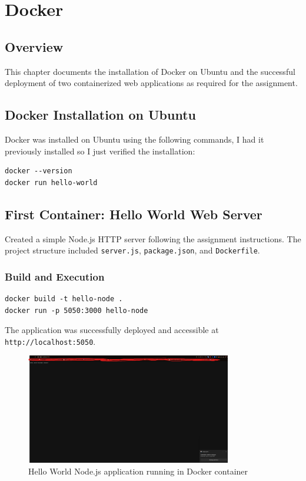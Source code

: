 \chapter{Docker}

\section{Overview}
This chapter documents the installation of Docker on Ubuntu and the successful deployment of two containerized web applications as required for the assignment.

\section{Docker Installation on Ubuntu}
Docker was installed on Ubuntu using the following commands, I had it previously installed so I just verified the installation:

\begin{verbatim}
docker --version
docker run hello-world
\end{verbatim}

\section{First Container: Hello World Web Server}
Created a simple Node.js HTTP server following the assignment instructions. The project structure included \texttt{server.js}, \texttt{package.json}, and \texttt{Dockerfile}.

\subsection{Build and Execution}
\begin{verbatim}
docker build -t hello-node .
docker run -p 5050:3000 hello-node
\end{verbatim}

The application was successfully deployed and accessible at \texttt{http://localhost:5050}.

\begin{figure}[H]
    \centering
    \includegraphics[width=0.8\textwidth]{png/Screenshot 2025-09-23 192048.png}
    \caption{Hello World Node.js application running in Docker container}
    \label{fig:hello-world}
\end{figure}

